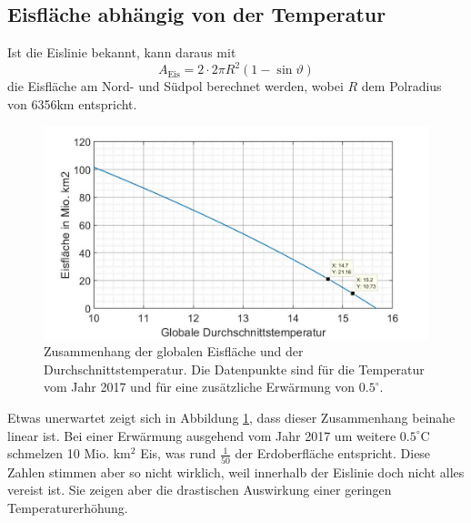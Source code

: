 \begin{refsection}
\subsection{Eisfläche abhängig von der Temperatur}
Ist die Eislinie bekannt, kann daraus mit
\begin{equation} \label{skript:eis:Eisfläche}
	A_\text{Eis}=2\cdot 2\pi R^2(1-\sin\vartheta)
\end{equation}
die Eisfläche am Nord- und Südpol berechnet werden, wobei $R$ dem Polradius von 6356km entspricht.
\begin{figure}
	\centering
	\includegraphics[width=14cm]{eis/Eisflaeche_abh_von_der_Temperatur.jpg}
	\caption{Zusammenhang der globalen Eisfläche und der Durchschnittstemperatur. Die Datenpunkte sind für die Temperatur vom Jahr 2017 und für eine zusätzliche Erwärmung von $0.5^{\circ}$.}
	\label{skript:eis:fig:Eisflaeche_abh_von_der_Temperatur}
\end{figure}
Etwas unerwartet zeigt sich in Abbildung \ref{skript:eis:fig:Eisflaeche_abh_von_der_Temperatur}, dass dieser Zusammenhang beinahe linear ist. Bei einer Erwärmung ausgehend vom Jahr 2017 um weitere $0.5^{\circ}$C schmelzen 10 Mio. km$^2$ Eis, was rund $\tfrac{1}{50}$ der Erdoberfläche entspricht. Diese Zahlen stimmen aber so nicht wirklich, weil innerhalb der Eislinie doch nicht alles vereist ist. Sie zeigen aber die drastischen Auswirkung einer geringen Temperaturerhöhung.

\end{refsection}
